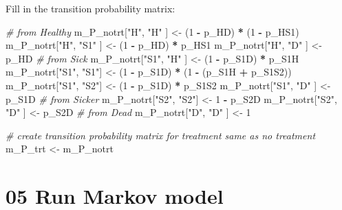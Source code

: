 \documentclass[
]{article}
\newenvironment{Shaded}{\begin{snugshade}}{\end{snugshade}}
\newcommand{\CommentTok}[1]{\textcolor[rgb]{0.56,0.35,0.01}{\textit{#1}}}
\newcommand{\DecValTok}[1]{\textcolor[rgb]{0.00,0.00,0.81}{#1}}
\newcommand{\NormalTok}[1]{#1}
\newcommand{\OperatorTok}[1]{\textcolor[rgb]{0.81,0.36,0.00}{\textbf{#1}}}
\newcommand{\StringTok}[1]{\textcolor[rgb]{0.31,0.60,0.02}{#1}}
\begin{document}
Fill in the transition probability matrix:

\begin{Shaded}
\begin{Highlighting}[]
\CommentTok{# from Healthy}
\NormalTok{m_P_notrt[}\StringTok{"H"}\NormalTok{, }\StringTok{"H"}\NormalTok{  ] <-}\StringTok{ }\NormalTok{(}\DecValTok{1} \OperatorTok{-}\StringTok{ }\NormalTok{p_HD) }\OperatorTok{*}\StringTok{ }\NormalTok{(}\DecValTok{1} \OperatorTok{-}\StringTok{ }\NormalTok{p_HS1)}
\NormalTok{m_P_notrt[}\StringTok{"H"}\NormalTok{, }\StringTok{"S1"}\NormalTok{ ] <-}\StringTok{ }\NormalTok{(}\DecValTok{1} \OperatorTok{-}\StringTok{ }\NormalTok{p_HD) }\OperatorTok{*}\StringTok{ }\NormalTok{p_HS1}
\NormalTok{m_P_notrt[}\StringTok{"H"}\NormalTok{, }\StringTok{"D"}\NormalTok{  ] <-}\StringTok{ }\NormalTok{p_HD}
\CommentTok{# from Sick}
\NormalTok{m_P_notrt[}\StringTok{"S1"}\NormalTok{, }\StringTok{"H"}\NormalTok{ ] <-}\StringTok{ }\NormalTok{(}\DecValTok{1} \OperatorTok{-}\StringTok{ }\NormalTok{p_S1D) }\OperatorTok{*}\StringTok{ }\NormalTok{p_S1H}
\NormalTok{m_P_notrt[}\StringTok{"S1"}\NormalTok{, }\StringTok{"S1"}\NormalTok{] <-}\StringTok{ }\NormalTok{(}\DecValTok{1} \OperatorTok{-}\StringTok{ }\NormalTok{p_S1D) }\OperatorTok{*}\StringTok{ }\NormalTok{(}\DecValTok{1} \OperatorTok{-}\StringTok{ }\NormalTok{(p_S1H }\OperatorTok{+}\StringTok{ }\NormalTok{p_S1S2))}
\NormalTok{m_P_notrt[}\StringTok{"S1"}\NormalTok{, }\StringTok{"S2"}\NormalTok{] <-}\StringTok{ }\NormalTok{(}\DecValTok{1} \OperatorTok{-}\StringTok{ }\NormalTok{p_S1D) }\OperatorTok{*}\StringTok{ }\NormalTok{p_S1S2}
\NormalTok{m_P_notrt[}\StringTok{"S1"}\NormalTok{, }\StringTok{"D"}\NormalTok{ ] <-}\StringTok{ }\NormalTok{p_S1D}
\CommentTok{# from Sicker}
\NormalTok{m_P_notrt[}\StringTok{"S2"}\NormalTok{, }\StringTok{"S2"}\NormalTok{] <-}\StringTok{ }\DecValTok{1} \OperatorTok{-}\StringTok{ }\NormalTok{p_S2D}
\NormalTok{m_P_notrt[}\StringTok{"S2"}\NormalTok{, }\StringTok{"D"}\NormalTok{ ] <-}\StringTok{ }\NormalTok{p_S2D}
\CommentTok{# from Dead}
\NormalTok{m_P_notrt[}\StringTok{"D"}\NormalTok{, }\StringTok{"D"}\NormalTok{  ] <-}\StringTok{ }\DecValTok{1}

\CommentTok{# create transition probability matrix for treatment same as no treatment}
\NormalTok{m_P_trt <-}\StringTok{ }\NormalTok{m_P_notrt}
\end{Highlighting}
\end{Shaded}

\hypertarget{run-markov-model}{%
\section{05 Run Markov model}\label{run-markov-model}}
\end{document}
